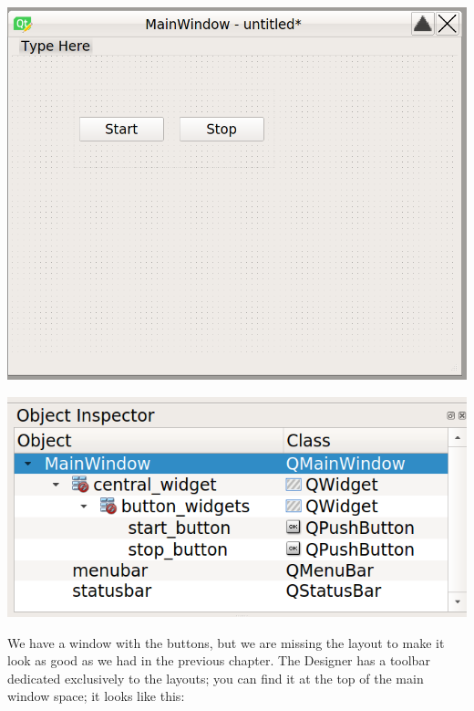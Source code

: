 \begin{minipage}{0.45\linewidth}
    \centering
    \includegraphics[width=\textwidth]{images/Chapter_09/05_main_window_buttons.png}
\end{minipage}
\hspace{0.5cm}
\begin{minipage}{0.45\linewidth}
    \centering
    \includegraphics[width=\textwidth]{images/Chapter_09/05_main_window_structure.png}
\end{minipage}


We have a window with the buttons, but we are missing the layout to make it look as good as we had in the previous chapter. The Designer has a toolbar dedicated exclusively to the layouts; you can find it at the top of the main window space; it looks like this:

